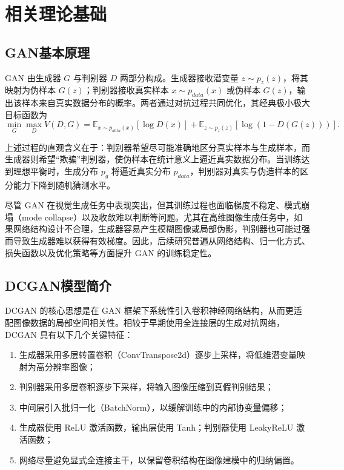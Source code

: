 \documentclass[12pt, a4paper, UTF8]{ctexart}
\begin{document}
\section{相关理论基础}
\subsection{GAN基本原理}

GAN 由生成器 $G$ 与判别器 $D$ 两部分构成。生成器接收潜变量 $z\sim p_z(z)$，将其映射为伪样本 $G(z)$；判别器接收真实样本 $x\sim p_{data}(x)$ 或伪样本 $G(z)$，输出该样本来自真实数据分布的概率。两者通过对抗过程共同优化，其经典极小极大目标函数为
\begin{equation}
\min_G \max_D V(D, G) =
\mathbb{E}_{x \sim p_{data}(x)}[\log D(x)] +
\mathbb{E}_{z \sim p_z(z)}[\log (1 - D(G(z)))].
\end{equation}

上述过程的直观含义在于：判别器希望尽可能准确地区分真实样本与生成样本，而生成器则希望“欺骗”判别器，使伪样本在统计意义上逼近真实数据分布。当训练达到理想平衡时，生成分布 $p_g$ 将逼近真实分布 $p_{data}$，判别器对真实与伪造样本的区分能力下降到随机猜测水平。

尽管 GAN 在视觉生成任务中表现突出，但其训练过程也面临梯度不稳定、模式崩塌（mode collapse）以及收敛难以判断等问题。尤其在高维图像生成任务中，如果网络结构设计不合理，生成器容易产生模糊图像或局部伪影，判别器也可能过强而导致生成器难以获得有效梯度。因此，后续研究普遍从网络结构、归一化方式、损失函数以及优化策略等方面提升 GAN 的训练稳定性。

\subsection{DCGAN模型简介}

DCGAN 的核心思想是在 GAN 框架下系统性引入卷积神经网络结构，从而更适配图像数据的局部空间相关性\cite{radford2015dcgan}。相较于早期使用全连接层的生成对抗网络，DCGAN 具有以下几个关键特征：
\begin{enumerate}
    \item 生成器采用多层转置卷积（ConvTranspose2d）逐步上采样，将低维潜变量映射为高分辨率图像；
    \item 判别器采用多层卷积逐步下采样，将输入图像压缩到真假判别结果；
    \item 中间层引入批归一化（BatchNorm），以缓解训练中的内部协变量偏移；
    \item 生成器使用 ReLU 激活函数，输出层使用 Tanh；判别器使用 LeakyReLU 激活函数；
    \item 网络尽量避免显式全连接主干，以保留卷积结构在图像建模中的归纳偏置。
\end{enumerate}
\end{document}
